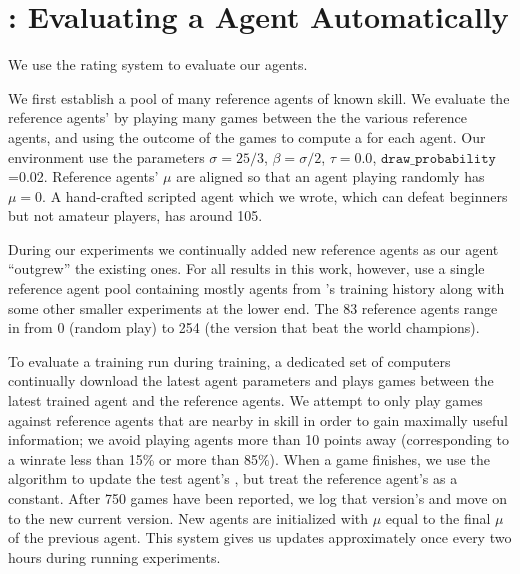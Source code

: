 \documentclass[ocean-paper.tex]{subfiles}
\begin{document}
\section{\trueskillname: Evaluating a \dota Agent Automatically}\label{appendix:trueskill}
We use the \trueskillname\cite{herbrich2007trueskill} rating system to evaluate our agents. 

We first establish a pool of many reference agents of known skill. 
We evaluate the reference agents' \trueskillname by playing many games between the the various reference agents, and using the outcome of the games to compute a \trueskillname for each agent. 
Our \trueskillname environment use the parameters $\sigma=25/3$, $\beta=\sigma/2$, $\tau=0.0$, $\texttt{draw\_probability}$=0.02.
Reference agents' $\mu$ are aligned so that an agent playing randomly has $\mu=0$.
A hand-crafted scripted agent which we wrote, which can defeat beginners but not amateur players, has \trueskillname around 105.

During our experiments we continually added new reference agents as our agent ``outgrew'' the existing ones.
For all results in this work, however, use a single reference agent pool containing mostly agents from \openaifive's training history along with some other smaller experiments at the lower end. 
The 83 reference agents range in \trueskillname from 0 (random play) to 254 (the version that beat the world champions).

To evaluate a training run during training, a dedicated set of computers continually download the latest agent parameters and plays games between the latest trained agent and the reference agents.
We attempt to only play games against reference agents that are nearby in skill in order to gain maximally useful information; we avoid playing agents more than 10 \trueskillname points away (corresponding to a winrate less than 15\% or more than 85\%).
When a game finishes, we use the \trueskillname algorithm to update the test agent's \trueskillname, but treat the reference agent's \trueskillname as a constant.
After 750 games have been reported, we log that version's \trueskillname and move on to the new current version.
New agents are initialized with $\mu$ equal to the final $\mu$ of the previous agent. 
This system gives us updates approximately once every two hours during running experiments.
\end{document}
